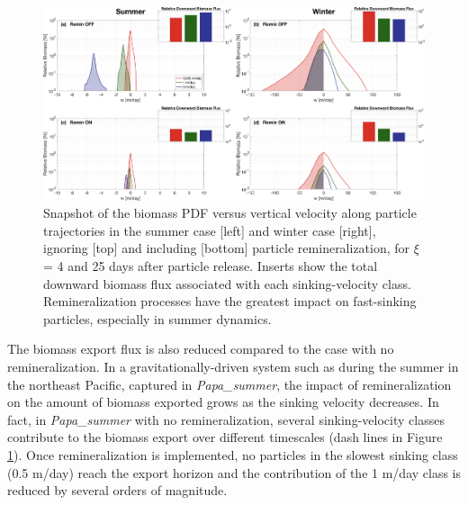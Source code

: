 \documentclass[draft,linenumbers]{agujournal2018}
\begin{document}
 \begin{figure}[t]
	\centering
	\includegraphics[width = 1\linewidth]{figures/Fig8.png}
	\caption{Snapshot of the biomass PDF versus vertical velocity along particle trajectories in the summer case [left] and winter case [right], ignoring [top] and including [bottom] particle remineralization, for $\xi$ = 4 and 25 days after particle release. Inserts show the total downward biomass flux associated with each sinking-velocity class. Remineralization processes have the greatest impact on fast-sinking particles, especially in summer dynamics.}	
	\label{fig: biomass_export_remin}
\end{figure}

 The biomass export flux is also reduced compared to the case with no remineralization. In a gravitationally-driven system such as during the summer in the northeast Pacific, captured in \textit{Papa\_summer}, the impact of remineralization on the amount of biomass exported grows as the sinking velocity decreases. In fact, in \textit{Papa\_summer} with no remineralization, several sinking-velocity classes contribute to the biomass export over different timescales (dash lines in Figure \ref{fig: biomass_export_remin}). Once remineralization is implemented, no particles in the slowest sinking class (0.5 m/day) reach the export horizon and the contribution of the 1 m/day class is reduced by several orders of magnitude.
 
\end{document}
